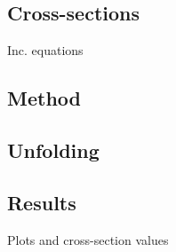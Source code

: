 \subsection{Cross-sections}
Inc. equations
\subsection{Method}
\subsection{Unfolding}
\subsection{Results}
Plots and cross-section values

\clearpage
